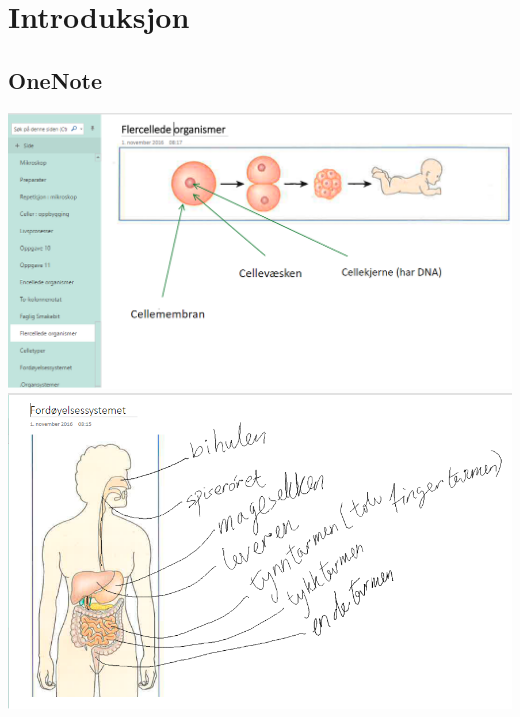 \documentclass[main.tex]{subfiles}
\begin{document}
\section{Introduksjon}
\label{sec:1}

\subsection{OneNote}
\hspace{-1.5cm}\includegraphics[scale = 0.7]{../figures/onenote_flercellet.png}
\newline
\hspace{-1.5cm}\includegraphics[scale = 0.7]{../figures/onenote_fordoyelse.png}
\end{document}
